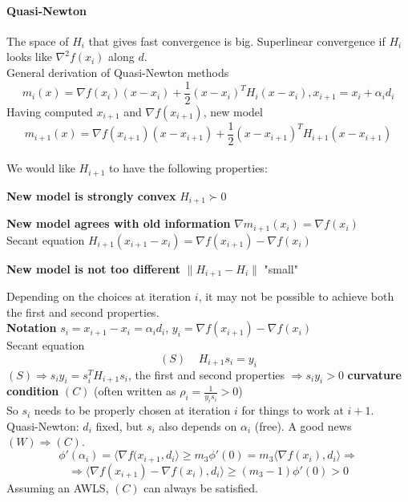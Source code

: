 \documentclass[10pt]{report}
\begin{document}
\paragraph{Quasi-Newton} The space of $H_i$ that gives fast convergence is big. Superlinear convergence if $H_i$ looks like $\nabla^2 f(x_i)$ along $d$.\\
General derivation of Quasi-Newton methods $$m_i(x) = \nabla f(x_i)(x-x_i)+\frac{1}{2}(x-x_i)^TH_i(x-x_i), x_{i+1} = x_i+\alpha_id_i$$
Having computed $x_{i+1}$ and $\nabla f(x_{i+1})$, new model
$$m_{i+1}(x) = \nabla f(x_{i+1})(x-x_{i+1})+\frac{1}{2}(x-x_{i+1})^TH_{i+1}(x-x_{i+1})$$\\
We would like $H_{i+1}$ to have the following properties:
\begin{list}{}{}
	\item \textbf{New model is strongly convex} $H_{i+1}\succ 0$
	\item \textbf{New model agrees with old information} $\nabla m_{i+1}(x_i) = \nabla f(x_i)$\\
	Secant equation $H_{i+1}(x_{i+1}-x_i)=\nabla f(x_{i+1})-\nabla f(x_i)$
	\item \textbf{New model is not too different} $\|H_{i+1} - H_i\|$ "small"
\end{list}
Depending on the choices at iteration $i$, it may not be possible to achieve both the first and second properties.\\
\textbf{Notation} $s_i = x_{i+1}- x_i = \alpha_id_i$, $y_i = \nabla f(x_{i+1}) -\nabla f(x_i)$\\
Secant equation 
$$(S)\:\:\:\:\:H_{i+1}s_i = y_i$$
$(S)\Rightarrow s_iy_i = s_i^TH_{i+1}s_i$, the first and second properties $\Rightarrow s_iy_i > 0$ \textbf{curvature condition} $(C)$ (often written as $\rho_i = \frac{1}{y_is_i} > 0$)\\
So $s_i$ needs to be properly chosen at iteration $i$ for things to work at $i+1$.\\
Quasi-Newton: $d_i$ fixed, but $s_i$ also depends on $\alpha_i$ (free). A good news $(W)\Rightarrow (C)$.
$$\phi'(\alpha_i)=\langle\nabla f(x_{i+1},d_i\rangle\geq m_3\phi'(0)=m_3\langle\nabla f(x_i), d_i\rangle\Rightarrow$$
$$\Rightarrow \langle\nabla f(x_{i+1})-\nabla f(x_i),d_i\rangle\geq (m_3-1)\phi'(0)> 0$$
Assuming an AWLS, $(C)$ can always be satisfied.
\end{document}
